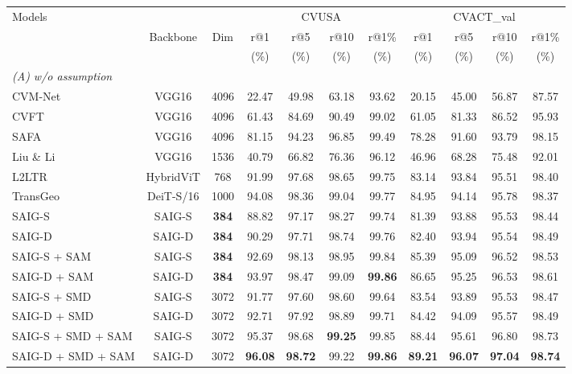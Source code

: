 \documentclass[sn-basic,iicol]{sn-jnl}
\theoremstyle{thmstyletwo}\newtheorem{example}{Example}\newtheorem{remark}{Remark}
\theoremstyle{thmstylethree}\newtheorem{definition}{Definition}
\begin{document}
\begin{table*}\scriptsize
\centering
\begin{tabular}{lcccccccccc}
\multirow{3}{*}{Models}& & & \multicolumn{4}{c}{CVUSA}&\multicolumn{4}{c}{CVACT\_val}\\ \cmidrule(lr){4-7} \cmidrule(lr){8-11} 
~ &Backbone& Dim& r@1 & r@5& r@10& r@1\%&  r@1 & r@5& r@10& r@1\%\\ 
 ~ &~ & ~& (\%) & (\%) & (\%) & (\%)& (\%) & (\%) & (\%) & (\%) \\
\toprule
\multicolumn{5}{l}{\emph{(A) w/o assumption}}&&&&&&\\
CVM-Net & VGG16 & 4096 &22.47&49.98&63.18&93.62&20.15&45.00&56.87&87.57\\
CVFT& VGG16 & 4096 & 61.43&84.69&90.49&99.02&61.05&81.33&86.52&95.93\\
SAFA& VGG16 & 4096 & 81.15&94.23&96.85&99.49&78.28&91.60&93.79&98.15\\
Liu \& Li& VGG16 & 1536 &40.79&66.82&76.36&96.12&46.96&68.28&75.48&92.01\\
L2LTR~& HybridViT  & 768 & 91.99 & 97.68&98.65&99.75&83.14&93.84&95.51&98.40\\ 
TransGeo~& DeiT-S/16  & 1000 & {94.08} & 98.36&99.04&99.77&84.95&94.14&95.78&98.37\\ 
\toprule
SAIG-S & SAIG-S  & \textbf{384} & 88.82 & 97.17 & 98.27 & 99.74 &81.39 &93.88&95.53&98.44 \\
SAIG-D & SAIG-D  & \textbf{384} & 90.29 & 97.71 & 98.74& 99.76 & 82.40 &93.94&95.54& 98.49 \\  
SAIG-S + SAM & SAIG-S  & \textbf{384} & 92.69 & 98.13 & 98.95 & 99.84 & 85.39 & 95.09 & 96.52 & 98.53 \\
SAIG-D + SAM & SAIG-D  & \textbf{384} & {93.97} & {98.47} & {99.09} & \textbf{99.86} & {86.65} & {95.25} & {96.53} & {98.61} \\
\toprule
SAIG-S + SMD & SAIG-S  & 3072 & 91.77 & 97.60 & 98.60 & 99.64 & 83.54  & 93.89 & 95.53 & 98.47 \\
SAIG-D + SMD & SAIG-D  & 3072 & {92.71}  & {97.92}  & {98.89} & 99.71 & {84.42} & {94.09} & {95.57} & {98.49} \\   
SAIG-S + SMD + SAM & SAIG-S  & 3072 & {95.37}  & {98.68}  & \textbf{99.25} & {99.85} & {88.44} & {95.61} & {96.80} & {98.73} \\
SAIG-D + SMD + SAM& SAIG-D  & 3072 & \textbf{96.08}  & \textbf{98.72}  & {99.22} & \textbf{99.86} & \textbf{89.21} & \textbf{96.07} & \textbf{97.04} & \textbf{98.74} \\

\end{tabular}
\end{table*}
\end{document}
